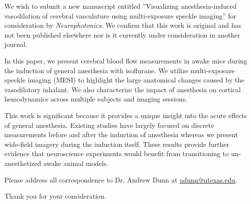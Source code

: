 \documentclass[12pt,stdletter,orderfromtodate,dateleft,sigleft]{newlfm}
\begin{document}
\begin{newlfm}

We wish to submit a new manuscript entitled ''Visualizing anesthesia-induced vasodilation of cerebral vasculature using multi-exposure speckle imaging'' for consideration by \emph{Neurophotonics}. We confirm that this work is original and has not been published elsewhere nor is it currently under consideration in another journal.

In this paper, we present cerebral blood flow measurements in awake mice during the induction of general anesthesia with isoflurane. We utilize multi-exposure speckle imaging (MESI) to highlight the large anatomical changes caused by the vasodilatory inhalant. We also characterize the impact of anesthesia on cortical hemodynamics across multiple subjects and imaging sessions.

This work is significant because it provides a unique insight into the acute effects of general anesthesia. Existing studies have largely focused on discrete measurements before and after the induction of anesthesia whereas we present wide-field imagery during the induction itself. These results provide further evidence that neuroscience experiments would benefit from transitioning to un-anesthetized awake animal models.

Please address all correspondence to Dr. Andrew Dunn at \href{mailto:adunn@utexas.edu}{\underline{adunn@utexas.edu}}.

Thank you for your consideration.

\end{newlfm}
\end{document}
